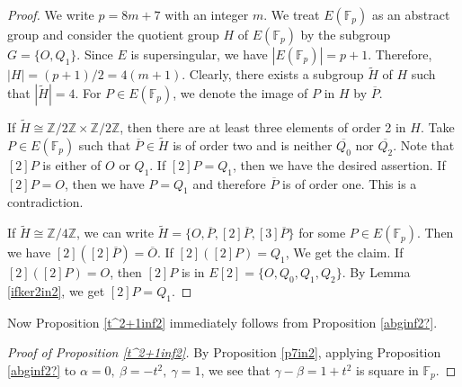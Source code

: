 \documentclass[10pt,a4paper]{amsart}
\theoremstyle{plain}
\newcommand{\fp}{\mathbb{F}_p}
\begin{document}
\begin{proof}
    We write $p=8m+7$ with an integer $m$. We treat $E(\fp)$ as an abstract group and consider the quotient group $H$ of $E(\fp)$ by the subgroup $G=\{ O,Q_1\}$. Since $E$ is supersingular, we have $|E(\fp)|=p+1$. Therefore,
    $|H|=(p+1)/2=4(m+1)$.
Clearly, there exists a subgroup $\widetilde{H}$ of $H$ such that $|\widetilde{H}|=4$. For $P\in E(\fp)$, we denote the image of $P$ in $H$ by $\overline{P}$.
   
    If $\widetilde{H} \cong \mathbb{Z}/2\mathbb{Z} \times \mathbb{Z}/2\mathbb{Z}$, then there are at least  three elements of order 2 in $H$. 
    Take  $P\in E(\fp)$ such that $\overline{P}\in \widetilde{H}$ is of order two and is neither $\overline{Q_0}$ nor $\overline{Q_2}$. Note that $[2]P$ is either of $O$ or $Q_1$. If $[2]P = Q_1$, then we have the desired assertion. If $[2]P=O$, then we have $P=Q_1$ and therefore $\overline{P}$ is of order one. This is a contradiction.

    If $\widetilde{H} \cong \mathbb{Z}/4\mathbb{Z} $, we can write $\widetilde{H}=\{ O,\overline{P},[2]\overline{P},[3]\overline{P} \}$ for some $P \in E(\fp)$. Then we have $[2]([2]\overline{P})=\overline{O}$. If $[2]([2]P)=Q_1$, We get the claim. If $[2]([2]P)=O$, then $[2]P$ is in $E[2]=\{ O,Q_0,Q_1,Q_2\}$. By Lemma \ref{ifker2in2}, we get $[2]P=Q_1$.
\end{proof}
Now Proposition \ref{t^2+1inf2} immediately follows from Proposition \ref{abginf2?}.
\begin{proof}[Proof of Proposition \ref{t^2+1inf2}]
    By Proposition \ref{p7in2}, applying Proposition \ref{abginf2?} to $\alpha=0,\ \beta=-t^2,\ \gamma=1$, we see that $\gamma-\beta=1+t^2$ is square in $\fp$.
\end{proof}
\end{document}
